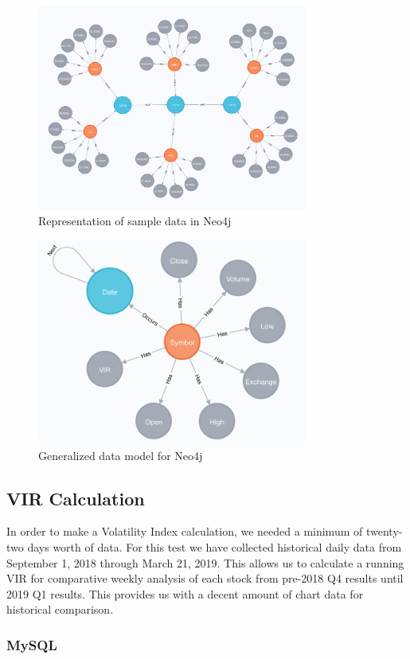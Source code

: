 \documentclass{IEEEtran}
\begin{document}
\begin{figure}
	\centering
	\includegraphics[width=3.5in]{Images/neo4j_data_model.png}
	\caption{Representation of sample data in Neo4j}
	\label{fig:neo4j_model}
\end{figure}

\begin{figure}
	\centering
	\includegraphics[width=3.5in]{Images/neo4j_general_model.png}
	\caption{Generalized data model for Neo4j}
	\label{fig:neo4j_gen_model}
\end{figure}

\subsection{VIR Calculation}

In order to make a Volatility Index calculation, we needed a minimum of twenty-two days worth of data. For this test we have collected historical daily data from September 1, 2018 through March 21, 2019. This allows us to calculate a running VIR for comparative weekly analysis of each stock from pre-2018 Q4 results until 2019 Q1 results. This provides us with a decent amount of chart data for historical comparison. 

\subsubsection{MySQL}
\end{document}
